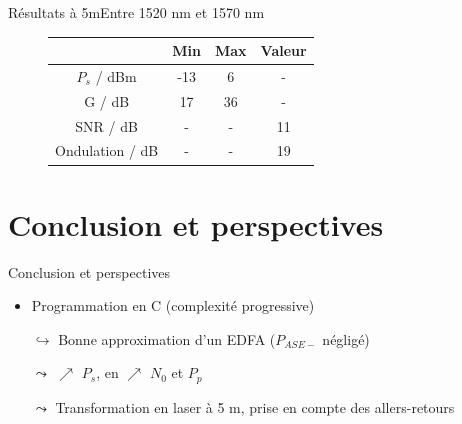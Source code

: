 \documentclass{beamer}
\begin{document}
\begin{frame}{Résultats à 5m}{Entre 1520 nm et 1570 nm}


\begin{figure}
\centering
\begin{tabular}{|c||c|c|c|}
\hline
  & Min & Max & Valeur\\
 \hline
  $P_s$ / dBm & -13 & 6 & -\\
 \hline
 G / dB & 17 & 36 & - \\
 \hline
 SNR / dB & - & - & 11 \\
 \hline
 Ondulation / dB & - & - & 19\\
 \hline
\end{tabular}
\end{figure}




\end{frame}


\section{Conclusion et perspectives}

\begin{frame}{Conclusion et perspectives}

  \begin{itemize}
  \item Programmation en C (complexité progressive)
  \item[$\hookrightarrow$] Bonne approximation d'un EDFA ($P_{ASE-}$ négligé)
  \end{itemize}
  
  \begin{itemize}
  \item[$\leadsto$] $\nearrow$ $P_s$, en $\nearrow$ $N_0$ et $P_p$
  \item[$\leadsto$] Transformation en laser à 5 m, prise en compte des allers-retours
  \end{itemize}

\end{frame}
\end{document}
